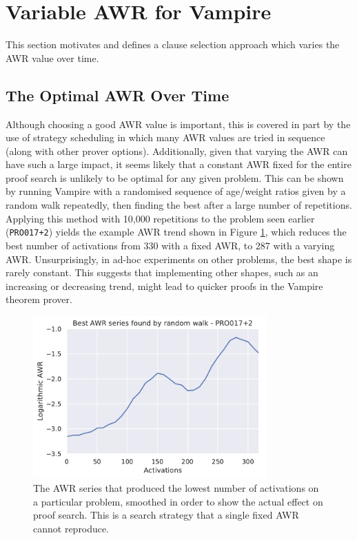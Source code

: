\documentclass{llncs}
\begin{document}
\section{Variable AWR for Vampire} 
This section motivates and defines a clause selection approach which varies the AWR value over time.

\subsection{The Optimal AWR Over Time} \label{sec:varying:study}

Although choosing a good AWR value is important, this is covered in part by the use of strategy scheduling in which many AWR values are tried in sequence (along with other prover options).
Additionally, given that varying the AWR can have such a large impact, it seems likely that a constant AWR fixed for the entire proof search is unlikely to be optimal for any given problem.
This can be shown by running Vampire with a randomised sequence of age/weight ratios given by a random walk repeatedly, then finding the best after a large number of repetitions.
Applying this method with 10,000 repetitions to the problem seen earlier (\texttt{PRO017+2}) yields the example AWR trend shown in Figure \ref{fig:random-walk}, which reduces the best number of activations from 330 with a fixed AWR, to 287 with a varying AWR. 
%
Unsurprisingly, in ad-hoc experiments on other problems, the best shape is rarely constant.
This suggests that implementing other shapes, such as an increasing or decreasing trend, might lead to quicker proofs in the Vampire theorem prover.

\begin{figure}[t]
	\centering
	\includegraphics[width=0.8\textwidth]{random-walk}
	\caption{The AWR series that produced the lowest number of activations on a particular problem, smoothed in order to show the actual effect on proof search. This is a search strategy that a single fixed AWR cannot reproduce.}
	\label{fig:random-walk}
\end{figure}
\end{document}
